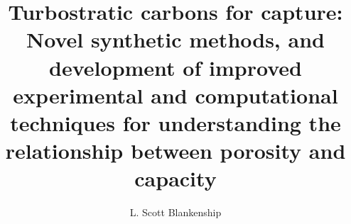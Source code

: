 \documentclass[a4paper,12pt,oneside]{report}
\begin{document}
\symbolfootnote


\title{Turbostratic carbons for  capture: Novel synthetic methods, and development of improved experimental and computational techniques for understanding the relationship between porosity and  capacity}

\makeatletter
\let\inserttitle\@title
\makeatother

\author{L. Scott Blankenship}

\normallinespacing
\maketitle

\preface








\newpage
\tableofcontents

\frontpagestyle


\mainpagestyle



%

%





\end{document}
